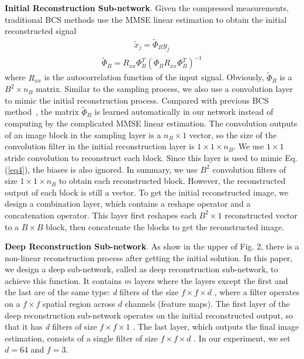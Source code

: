 \documentclass[5pt]{article}
\begin{document}
\textbf{Initial Reconstruction Sub-network}. Given the compressed measurements, traditional BCS methods use the MMSE linear estimation to obtain the initial reconstructed signal
\begin{eqnarray} \label{eq4}
{\tilde x_j} = {\tilde \Phi _B}{y_j}
\end{eqnarray}
\begin{eqnarray}\label{eq5}
{\tilde \Phi _B} = {R_{xx}}\Phi _B^T{\left( {{\Phi _B}{R_{xx}}\Phi _B^T} \right)^{ - 1}}
\end{eqnarray}
where ${R_{xx}}$ is the autocorrelation function of the input signal. Obviously, ${\tilde \Phi _B}$ is a ${B^2} \times {n_B}$ matrix. Similar to the sampling process, we also use a convolution layer to mimic the initial reconstruction process. Compared with previous BCS method~\cite{rf1}, the matrix ${\tilde \Phi _B}$ is learned automatically in our network instead of computing by the complicated MMSE linear estimation. The convolution outputs of an image block in the sampling layer is a ${n_B} \times 1$  vector, so the size of the convolution filter in the initial reconstruction layer is $1 \times 1 \times {n_B}$. We use $1 \times 1$ stride convolution to reconstruct each block. Since this layer is used to mimic Eq. (\ref{eq4}), the biases is also ignored. In summary, we use ${B^2}$ convolution filters of size $1 \times 1 \times {n_B}$ to obtain each reconstructed block. However, the reconstructed output of each block is still a vector. To get the initial reconstructed image, we design a combination layer, which contains a reshape operator and a concatenation operator. This layer first reshapes each ${B^2} \times 1$ reconstructed vector to a $B \times B$ block, then concatenate the blocks to get the reconstructed image.

\textbf{Deep Reconstruction Sub-network}. As show in the upper of Fig. 2, there is a non-linear reconstruction process after getting the initial solution. In this paper, we design a deep sub-network, called as deep reconstruction sub-network, to achieve this function. It contains $m$ layers where the layers except the first and the last are of the same type: \emph{d} filters of the size $f \times f \times d$ , where a filter operates on a $f \times f$ spatial region across $d$ channels (feature maps). The first layer of the deep reconstruction sub-network operates on the initial reconstructed output, so that it has \emph{d} filters of size $f \times f \times 1$ . The last layer, which outputs the final image estimation, consists of a single filter of size $f \times f \times d$ . In our experiment, we set $d = 64$ and $f = 3$.
\end{document}
